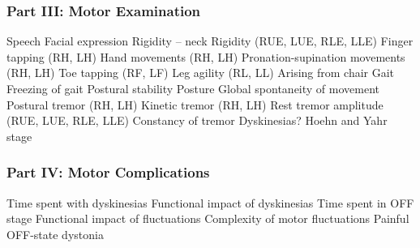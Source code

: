\begin{multicols}{2}
\subsubsection*{Part III: Motor Examination\vspace{-0.5cm}}
Speech\newline
Facial expression\newline
Rigidity – neck\newline
Rigidity (RUE, LUE, RLE, LLE)\newline
Finger tapping (RH, LH)\newline
Hand movements (RH, LH)\newline
Pronation-supination movements (RH, LH)\newline
Toe tapping (RF, LF)\newline
Leg agility (RL, LL)\newline
Arising from chair\newline
Gait\newline
Freezing of gait\newline
Postural stability\newline
Posture\newline
Global spontaneity of movement\newline
Postural tremor (RH, LH)\newline
Kinetic tremor (RH, LH)\newline
Rest tremor amplitude (RUE, LUE, RLE, LLE)\newline
Constancy of tremor\newline
Dyskinesias?\newline
Hoehn and Yahr stage%
%
\vspace{-0.5cm}
\subsubsection*{Part IV: Motor Complications\vspace{-0.5cm}}
Time spent with dyskinesias\newline
Functional impact of dyskinesias\newline
Time spent in OFF stage\newline
Functional impact of fluctuations\newline
Complexity of motor fluctuations\newline
Painful OFF-state dystonia

\end{multicols}